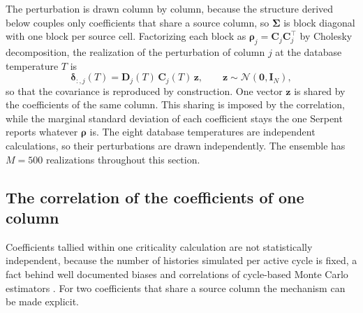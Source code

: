 The perturbation is drawn column by column, because the structure derived below
couples only coefficients that share a source column, so $\boldsymbol\Sigma$ is
block diagonal with one block per source cell. Factorizing each block as
$\boldsymbol\rho_j = \mathbf C_j\mathbf C_j^{\top}$ by Cholesky decomposition,
the realization of the perturbation of column $j$ at the database temperature
$T$ is
%
\begin{equation}
  \boldsymbol\delta_{:,j}(T) = \mathbf D_j(T)\,\mathbf C_j(T)\,\mathbf z,
  \qquad \mathbf z\sim\mathcal N(\mathbf 0,\mathbf I_N),
  \label{cr:eq:cholesky}
\end{equation}
%
so that the covariance is reproduced by construction. One vector $\mathbf z$ is
shared by the coefficients of the same column. This sharing is imposed by the
correlation, while the marginal standard deviation of each coefficient stays
the one Serpent reports whatever $\boldsymbol\rho$ is. The eight database
temperatures are independent calculations, so their perturbations are drawn
independently. The ensemble has $M=500$ realizations throughout this section.

\subsection{The correlation of the coefficients of one column}\label{cr:sec:derivation}

Coefficients tallied within one criticality calculation are not statistically
independent,
because the number of histories simulated per active cycle is fixed, a fact
behind well documented biases and correlations of cycle-based Monte Carlo
estimators \cite{BrissendenGarlick1986}. For two coefficients that share a
source column the mechanism can be made explicit.

